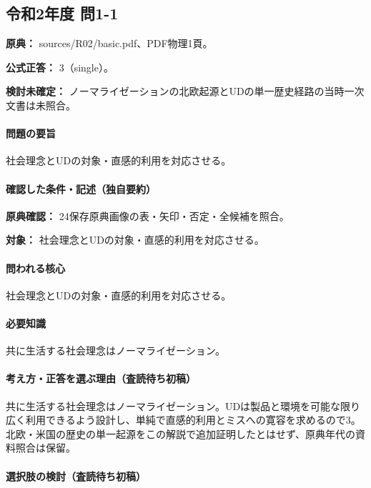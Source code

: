 \subsection{令和2年度 問1-1}
\label{q:r02-reg-basic-1-1}

\noindent\textbf{原典：} sources/R02/basic.pdf、PDF物理1頁。

\textbf{公式正答：} 3（single）。

\par\textbf{検討未確定：} ノーマライゼーションの北欧起源とUDの単一歴史経路の当時一次文書は未照合。

\paragraph{問題の要旨} 社会理念とUDの対象・直感的利用を対応させる。

\paragraph{確認した条件・記述（独自要約）}\mbox{}\par

\noindent\textbf{原典確認：} 24保存原典画像の表・矢印・否定・全候補を照合。\par

\noindent\textbf{対象：} 社会理念とUDの対象・直感的利用を対応させる。\par

\paragraph{問われる核心} 社会理念とUDの対象・直感的利用を対応させる。

\paragraph{必要知識} 共に生活する社会理念はノーマライゼーション。

\paragraph{考え方・正答を選ぶ理由（査読待ち初稿）} 共に生活する社会理念はノーマライゼーション。UDは製品と環境を可能な限り広く利用できるよう設計し、単純で直感的利用とミスへの寛容を求めるので3。北欧・米国の歴史の単一起源をこの解説で追加証明したとはせず、原典年代の資料照合は保留。

\paragraph{選択肢の検討（査読待ち初稿）}\mbox{}\par

